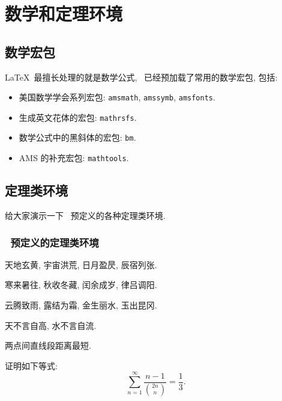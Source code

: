 \chapter{数学和定理环境}
\label{cha:theorem}
\section{数学宏包}
\LaTeX\ 最擅长处理的就是数学公式, \shuthesis\ 已经预加载了常用的数学宏包, 包括:
\begin{itemize}
    \item 美国数学学会系列宏包: \texttt{amsmath}, \texttt{amssymb}, \texttt{amsfonts}.
    \item 生成英文花体的宏包: \texttt{mathrsfs}.
    \item 数学公式中的黑斜体的宏包: \texttt{bm}.
    \item AMS 的补充宏包: \texttt{mathtools}.
\end{itemize}

\section{定理类环境}
给大家演示一下 \shuthesis\ 预定义的各种定理类环境.

\subsection{\shuthesis\ 预定义的定理类环境}
\begin{assumption}
    天地玄黄, 宇宙洪荒, 日月盈昃, 辰宿列张.
\end{assumption}

\begin{definition}
    寒来暑往, 秋收冬藏, 闰余成岁, 律吕调阳.
\end{definition}

\begin{proposition}
    云腾致雨, 露结为霜, 金生丽水, 玉出昆冈.
\end{proposition}

\begin{remark}
    天不言自高, 水不言自流.
\end{remark}

\begin{axiom}
    两点间直线段距离最短.
\end{axiom}

\begin{lemma}
    证明如下等式:
    \[
        \sum_{n=1}^{\infty}\frac{n-1}{\binom{2n}{n}}=\frac{1}{3}.
    \]
\end{lemma}

